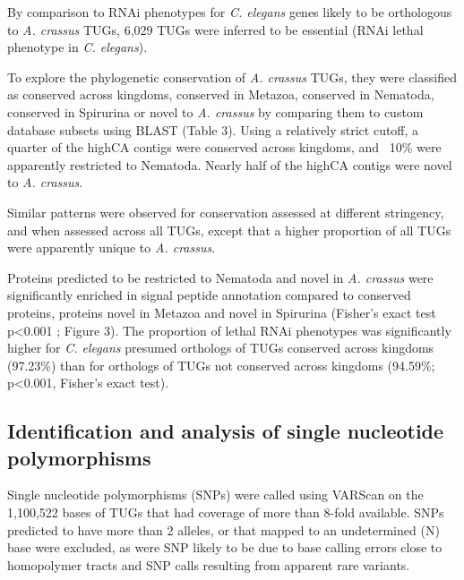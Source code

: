 \documentclass[10pt]{bmc_article}
\newenvironment{bmcformat}{\begin{raggedright}\baselineskip20pt\sloppy\setboolean{publ}{false}}{\end{raggedright}\baselineskip20pt\sloppy}
\begin{document}
\begin{bmcformat}
By comparison to RNAi phenotypes for \textit{C. elegans} genes
\cite{pmid12529635, pmid19910365} likely to be orthologous to
\textit{A. crassus} TUGs, 6,029 TUGs were inferred to be essential
(RNAi lethal phenotype in \textit{C. elegans}).

To explore the phylogenetic conservation of \textit{A. crassus} TUGs,
they were classified as conserved across kingdoms, conserved in
Metazoa, conserved in Nematoda, conserved in Spirurina or novel to
\textit{A. crassus} by comparing them to custom database subsets using
BLAST (Table 3). Using a relatively strict cutoff, a quarter of the
highCA contigs were conserved across kingdoms, and ~10\% were
apparently restricted to Nematoda. Nearly half of the highCA contigs
were novel to \textit{A. crassus}.

Similar patterns were observed for conservation assessed at different
stringency, and when assessed across all TUGs, except that a higher
proportion of all TUGs were apparently unique to \textit{A. crassus}.

Proteins predicted to be restricted to Nematoda and novel in
\textit{A. crassus} were significantly enriched in signal peptide
annotation compared to conserved proteins, proteins novel in Metazoa
and novel in Spirurina (Fisher's exact test p<0.001 ; Figure 3). The
proportion of lethal RNAi phenotypes was significantly higher for
\textit{C. elegans} presumed orthologs of TUGs conserved across
kingdoms (97.23\%) than for orthologs of TUGs not conserved across
kingdoms (94.59\%; p<0.001, Fisher's exact test).

\subsection*{Identification and analysis of single nucleotide
  polymorphisms}

Single nucleotide polymorphisms (SNPs) were called using VARScan
\cite{pmid19542151} on the 1,100,522 bases of TUGs that
had coverage of more than 8-fold available. SNPs predicted to have
more than 2 alleles, or that mapped to an undetermined (N) base were
excluded, as were SNP likely to be due to base calling errors close to
homopolymer tracts and SNP calls resulting from apparent rare
variants. 


\end{bmcformat}
\end{document}
